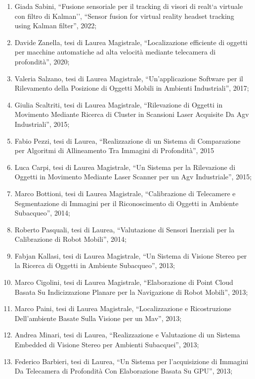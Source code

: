 \documentclass[11pt]{article}
\begin{document}
\begin{itemize}
\begin{enumerate}
\item Giada Sabini, ``Fusione sensoriale per il tracking di visori di realt`a virtuale con filtro di Kalman'', 
  ``Sensor fusion for virtual reality headset tracking using Kalman filter'', 2022; 
%
\item Davide Zanella, tesi di Laurea Magistrale, ``Localizazione efficiente di oggetti per macchine automatiche ad alta velocit\`a mediante telecamera di profondit\`a'', 2020;
\item Valeria Salzano, tesi di Laurea Magistrale, ``Un'applicazione Software per il Rilevamento della Posizione di Oggetti Mobili  in Ambienti Industriali'', 2017;
%
\item Giulia Scaltriti, tesi di Laurea Magistrale, ``Rilevazione di Oggetti in Movimento Mediante Ricerca di Cluster  in Scansioni Laser Acquisite Da Agv Industriali'', 2015;
\item Fabio Pezzi, tesi di Laurea, ``Realizzazione di un Sistema di Comparazione per Algoritmi di Allineamento Tra Immagini di Profondit\`a'', 2015
\item Luca Carpi, tesi di Laurea Magistrale, ``Un Sistema per la Rilevazione di Oggetti in Movimento Mediante Laser Scanner per un Agv Industriale'', 2015;
%
\item Marco Bottioni, tesi di Laurea Magistrale, ``Calibrazione di Telecamere e Segmentazione di Immagini per il Riconoscimento di Oggetti in Ambiente Subacqueo'', 2014;
\item Roberto Pasquali, tesi di Laurea, ``Valutazione di Sensori Inerziali per la Calibrazione di Robot Mobili'', 2014;
%
\item Fabjan Kallasi,  tesi di Laurea Magistrale, ``Un Sistema di Visione Stereo per la Ricerca di Oggetti in Ambiente Subacqueo'', 2013;
\item Marco Cigolini, tesi di Laurea Magistrale, ``Elaborazione di Point Cloud Basata Su Indicizzazione Planare per la Navigazione di Robot Mobili'', 2013;
\item Marco Paini, tesi di Laurea Magistrale, ``Localizzazione e Ricostruzione Dell'ambiente Basate Sulla Visione per un Mav'', 2013;
\item Andrea Minari, tesi di Laurea, ``Realizzazione e Valutazione di un Sistema Embedded di Visione Stereo per Ambienti Subacquei'', 2013;
\item Federico Barbieri, tesi di Laurea, ``Un Sistema per l'acquisizione di Immagini Da Telecamera di Profondit\`a Con Elaborazione Basata Su GPU'', 2013;

\end{enumerate}
\end{itemize}
\end{document}
